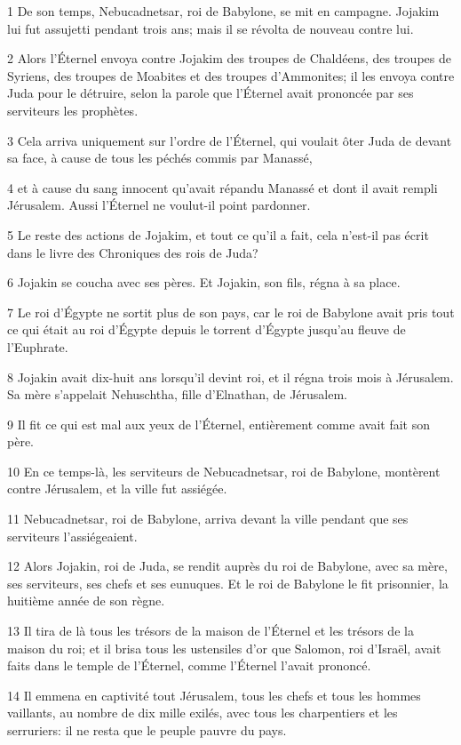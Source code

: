 \par 1 De son temps, Nebucadnetsar, roi de Babylone, se mit en campagne. Jojakim lui fut assujetti pendant trois ans; mais il se révolta de nouveau contre lui.
\par 2 Alors l'Éternel envoya contre Jojakim des troupes de Chaldéens, des troupes de Syriens, des troupes de Moabites et des troupes d'Ammonites; il les envoya contre Juda pour le détruire, selon la parole que l'Éternel avait prononcée par ses serviteurs les prophètes.
\par 3 Cela arriva uniquement sur l'ordre de l'Éternel, qui voulait ôter Juda de devant sa face, à cause de tous les péchés commis par Manassé,
\par 4 et à cause du sang innocent qu'avait répandu Manassé et dont il avait rempli Jérusalem. Aussi l'Éternel ne voulut-il point pardonner.
\par 5 Le reste des actions de Jojakim, et tout ce qu'il a fait, cela n'est-il pas écrit dans le livre des Chroniques des rois de Juda?
\par 6 Jojakin se coucha avec ses pères. Et Jojakin, son fils, régna à sa place.
\par 7 Le roi d'Égypte ne sortit plus de son pays, car le roi de Babylone avait pris tout ce qui était au roi d'Égypte depuis le torrent d'Égypte jusqu'au fleuve de l'Euphrate.
\par 8 Jojakin avait dix-huit ans lorsqu'il devint roi, et il régna trois mois à Jérusalem. Sa mère s'appelait Nehuschtha, fille d'Elnathan, de Jérusalem.
\par 9 Il fit ce qui est mal aux yeux de l'Éternel, entièrement comme avait fait son père.
\par 10 En ce temps-là, les serviteurs de Nebucadnetsar, roi de Babylone, montèrent contre Jérusalem, et la ville fut assiégée.
\par 11 Nebucadnetsar, roi de Babylone, arriva devant la ville pendant que ses serviteurs l'assiégeaient.
\par 12 Alors Jojakin, roi de Juda, se rendit auprès du roi de Babylone, avec sa mère, ses serviteurs, ses chefs et ses eunuques. Et le roi de Babylone le fit prisonnier, la huitième année de son règne.
\par 13 Il tira de là tous les trésors de la maison de l'Éternel et les trésors de la maison du roi; et il brisa tous les ustensiles d'or que Salomon, roi d'Israël, avait faits dans le temple de l'Éternel, comme l'Éternel l'avait prononcé.
\par 14 Il emmena en captivité tout Jérusalem, tous les chefs et tous les hommes vaillants, au nombre de dix mille exilés, avec tous les charpentiers et les serruriers: il ne resta que le peuple pauvre du pays.
